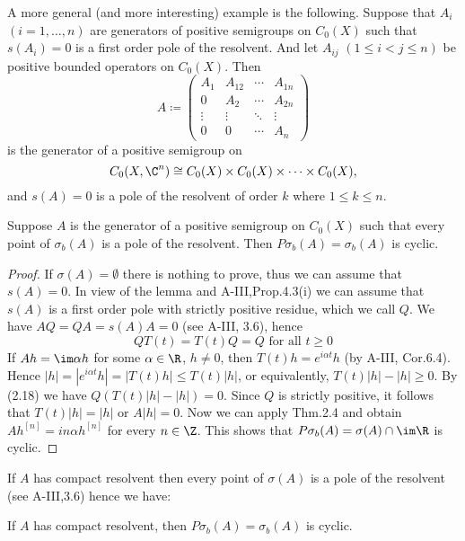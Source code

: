 A more general (and more interesting) example is the following.
Suppose that $A_{i}$ $(i = 1,\ldots,n)$ are generators of positive semigroups on $C_{0}(X)$ such that $s(A_{i}) = 0$ is a first order pole of the resolvent.
And let $A_{ij}$ $(1 \leq i < j \leq n)$ be positive bounded operators on $C_{0}(X)$.
Then
\[
A \coloneqq \begin{pmatrix}
	A_{1} & A_{12} & \cdots & A_{1n} \\
	0 & A_{2} & \cdots & A_{2n} \\
	\vdots & \vdots & \ddots & \vdots \\
	0 & 0 & \cdots & A_{n}
\end{pmatrix}
\]
is the generator of a positive semigroup on 
%
\[
	C_{0}(X,\C^{n}) \cong C_{0}(X) \times C_{0}(X) \times \cdots \times C_{0}(X) , 
\]
%
and $s(A) = 0$ is a pole of the resolvent of order $k$ where $1 \leq k \leq n$.
\begin{theorem}\label{thm:b3-2.9}
Suppose $A$ is the generator of a positive semigroup on $C_{0}(X)$ such that every point of $\sigma_{b}(A)$ is a pole of the resolvent. 
Then $P\sigma_{b}(A) = \sigma_{b}(A)$ is cyclic.
\end{theorem}
%
%	
\begin{proof}
	If $\sigma(A) = \emptyset$ there is nothing to prove, thus we can assume that $s(A) = 0$.
	In view of the lemma and A-III,Prop.4.3(i) we can assume that $s(A)$ is a first order pole with strictly positive residue, which we call $Q$.
	We have $AQ = QA = s(A)A = 0$ (see A-III, 3.6), hence
	\begin{equation}\label{eq:b3-2.18}
		QT(t) = T(t)Q = Q \text{ for all } t \geq 0
	\end{equation}
	If $Ah = \im\alpha h$ for some $\alpha \in \R$, $h \neq 0$, then $T(t)h = e^{i\alpha t}h$ (by A-III, Cor.6.4).
	Hence $|h| = |e^{i\alpha t}h| = |T(t)h| \leq T(t)|h|$, or equivalently, $T(t)|h| - |h| \geq 0$.
	By (2.18) we have $Q(T(t)|h| - |h|) = 0$.
	Since $Q$ is strictly positive, it follows that $T(t)|h| = |h|$ or $A|h| = 0$.
	Now we can apply Thm.2.4 and obtain $Ah^{[n]} = in\alpha h^{[n]}$ for every $n \in \Z$.
	This shows that $P\sigma_{b}(A) = \sigma(A) \cap \im\R$ is cyclic.
\end{proof}
If $A$ has compact resolvent then every point of $\sigma(A)$ is a pole of the resolvent (see A-III,3.6) hence we have:
\begin{corollary}\label{cor:b3-2.10}
If $A$ has compact resolvent, then $P\sigma_{b}(A) = \sigma_{b}(A)$ is cyclic.
\end{corollary}
